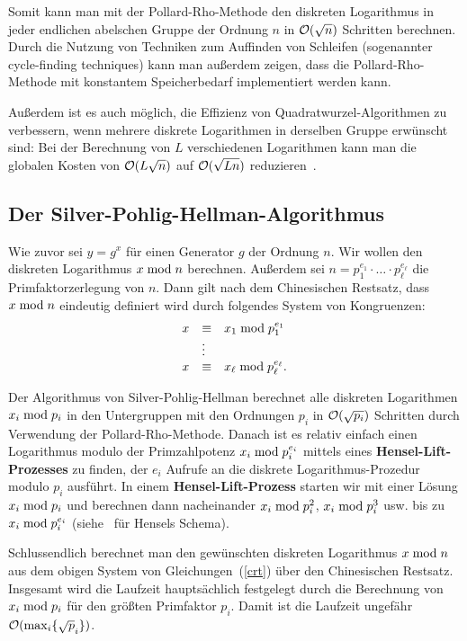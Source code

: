 \begin{refsegment}
Somit kann man mit der Pollard-Rho-Methode den diskreten Logarithmus in jeder endlichen abelschen Gruppe der Ordnung $n$ in ${\cal O}(\sqrt n)$ Schritten berechnen. Durch die Nutzung von Techniken zum Auffinden von Schleifen (sogenannter cycle-finding techniques) kann man außerdem zeigen, dass die Pollard-Rho-Methode mit konstantem Speicherbedarf implementiert werden kann.

Außerdem ist es auch möglich, die Effizienz von Quadratwurzel-Algorithmen zu verbessern, wenn mehrere diskrete Logarithmen in derselben Gruppe erwünscht sind: Bei der Berechnung von $L$ verschiedenen Logarithmen kann man die globalen Kosten von ${\cal O} (L\sqrt{n})$ auf ${\cal O} (\sqrt{Ln})$ reduzieren~\cite{multiple2014}.


\subsection{Der Silver-Pohlig-Hellman-Algorithmus}
Wie zuvor sei $y = g^{x}$ für einen Generator $g$ der Ordnung $n$. Wir wollen den diskreten Logarithmus $x \hspace{1mm}{\rm mod}\hspace{1mm} n$ berechnen. Außerdem sei $n=p_1^{e_1} \cdot \ldots \cdot p_{\ell}^{e_{\ell}}$ die Primfaktorzerlegung von $n$. Dann gilt nach dem Chinesischen Restsatz, dass $x \hspace{1mm}{\rm mod}\hspace{1mm} n$ eindeutig definiert wird durch folgendes System von Kongruenzen:
\begin{equation}
\label{crt}
\begin{array}{lll}
  x & \equiv & x_1 \hspace{1mm}{\rm mod}\hspace{1mm} p_1^{e_1}\\
    & \vdots\\
  x & \equiv & x_{\ell} \hspace{1mm}{\rm mod}\hspace{1mm} p_{\ell}^{e_{\ell}}.	
\end{array}
\end{equation}

Der Algorithmus von Silver-Pohlig-Hellman berechnet alle diskreten Logarithmen $x_i \hspace{1mm}{\rm mod}\hspace{1mm} p_i$ in den Untergruppen mit den Ordnungen $p_i$ in ${\cal O}(\sqrt{p_i})$ Schritten durch Verwendung der Pollard-Rho-Methode. Danach ist es relativ einfach einen Logarithmus modulo der Primzahlpotenz $x_i \hspace{1mm}{\rm mod}\hspace{1mm} p_i^{e_i}$ mittels eines \textbf{Hensel-Lift-Prozesses} zu finden, der $e_i$ Aufrufe an die diskrete Logarithmus-Prozedur modulo $p_i$ ausführt. In einem \textbf{Hensel-Lift-Prozess} starten wir mit einer Lösung $x_i \hspace{1mm}{\rm mod}\hspace{1mm} p_i$ und berechnen dann nacheinander $x_i \hspace{1mm}{\rm mod}\hspace{1mm} p_i^2$, $x_i \hspace{1mm}{\rm mod}\hspace{1mm} p_i^3$ usw. bis zu $x_i \hspace{1mm}{\rm mod}\hspace{1mm} p_i^{e_i}$ (siehe~\cite{May2013} für Hensels Schema).

Schlussendlich berechnet man den gewünschten diskreten Logarithmus $x \hspace{1mm}{\rm mod}\hspace{1mm} n$ aus dem obigen System von Gleichungen~(\ref{crt}) über den Chinesischen Restsatz.
Insgesamt wird die Laufzeit hauptsächlich festgelegt durch die Berechnung von $x_i \hspace{1mm}{\rm mod}\hspace{1mm} p_i$ für den größten Primfaktor $p_i$. Damit ist die Laufzeit ungefähr ${\cal O}(\max_i\{\sqrt p_i\})$.



\end{refsegment}
